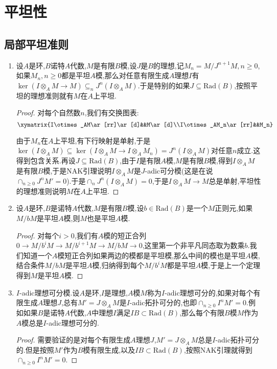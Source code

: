 \section{平坦性}
\subsection{局部平坦准则}
\begin{enumerate}
	\item 设$A$是环,$B$诺特$A$代数,$M$是有限$B$模,设$J$是$B$的理想,记$M_n=M/J^{n+1}M,n\ge0$,如果$M_n,n\ge0$都是平坦$A$模,那么对任意有限生成$A$理想$I$有$\ker(I\otimes_AM\to M)\subseteq_nJ^n(I\otimes_AM)$.于是特别的如果$J\subseteq\mathrm{Rad}(B)$,按照平坦的理想准则就有$M$在$A$上平坦.
	\begin{proof}
		
		对每个自然数$n$,我们有交换图表:
		$$\xymatrix{I\otimes_AM\ar[rr]\ar[d]&&M\ar[d]\\I\otimes_AM_n\ar[rr]&&M_n}$$
		
		由于$M_n$在$A$上平坦,有下行映射是单射,于是$\ker(I\otimes_AM)\subseteq\ker(I\otimes_AM\to I\otimes_AM_n)=J^n(I\otimes_AM)$对任意$n$成立.这得到包含关系.再设$J\subseteq\mathrm{Rad}(B)$,由于$I$是有限$A$模,$M$是有限$B$模,得到$I\otimes_AM$是有限$B$模,于是NAK引理说明$I\otimes_AM$是$J$-adic可分模(这是在说$\cap_{n\ge0}J^nM'=0$).于是$\cap_nJ^n(I\otimes_AM)=0$,于是$I\otimes_AM\to M$总是单射,平坦性的理想准则说明$M$在$A$上平坦.
	\end{proof}
    \item 设$A$是环,$B$是诺特$A$代数,$M$是有限$B$模,设$b\in\mathrm{Rad}(B)$是一个$M$正则元,如果$M/bM$是平坦$A$模,则$M$也是平坦$A$模.
    \begin{proof}
    	
    	对每个$i>0$,我们有$A$模的短正合列$0\to M/b^iM\to M/b^{i+1}M\to M/bM\to0$,这里第一个非平凡同态取为数乘$b$.我们知道一个$A$模短正合列如果两边的模都是平坦模,那么中间的模也是平坦$A$模,结合条件$M/bM$是平坦$A$模,归纳得到每个$M/b^iM$都是平坦$A$模,于是上一个定理得到$M$是平坦$A$模.
    \end{proof}
    \item $I$-adic理想可分模.设$A$是环,$I$是理想,$A$模$M$称为$I$-adic理想可分的,如果对每个有限生成$A$理想$J$,总有$M'=J\otimes_AM$是$I$-adic拓扑可分的,也即$\cap_{n\ge0}I^nM'=0$.例如如果$B$是诺特$A$代数,$A$中理想$I$满足$IB\subset\mathrm{Rad}(B)$,那么每个有限$B$模$M$作为$A$模总是$I$-adic理想可分的.
    \begin{proof}
    	
    	需要验证的是对每个有限生成$A$理想$J$,$M'=J\otimes_AM$总是$I$-adic拓扑可分的.但是按照$M'$作为$B$模有限生成,以及$IB\subset\mathrm{Rad}(B)$,按照NAK引理就得到$\cap_{n\ge0}I^nM'=0$.
    \end{proof}
\end{enumerate}

